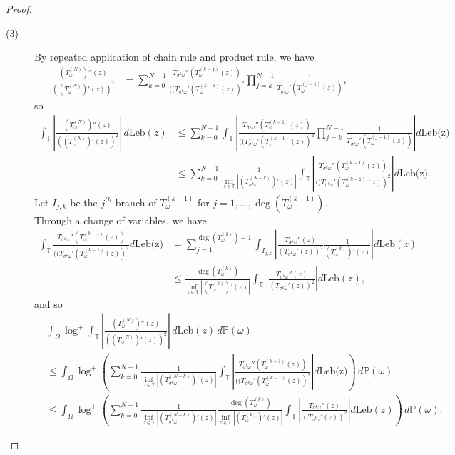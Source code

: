 \documentclass[12pt,reqno]{amsart}
\numberwithin{theorem}{section}
\begin{document}
\begin{proof}
\begin{description}
    \item[(3)] By repeated application of chain rule and product rule, we have \begin{align*}
        \frac{(T_{\omega}^{(N)})''(z)}{((T_{\omega}^{(N)})'(z))^2}&=\sum_{k=0}^{N-1}\frac{T_{\sigma^{k}\omega}''(T_{\omega}^{(k-1)}(z))}{((T_{\sigma^{k}\omega}'(T_{\omega}^{(k-1)}(z))^2}\prod_{j=k}^{N-1}\frac{1}{T_{\sigma^{j}\omega}'(T_{\omega}^{(j-1)}(z))},
    \end{align*} so \begin{align*}
        \int_{\mathbb{T}}\left|\frac{(T_{\omega}^{(N)})''(z)}{((T_{\omega}^{(N)})'(z))^2}\right|\,d\text{Leb}(z)&\le\sum_{k=0}^{N-1}\int_{\mathbb{T}}\left|\frac{T_{\sigma^{k}\omega}''(T_{\omega}^{(k-1)}(z))}{((T_{\sigma^{k}\omega}'(T_{\omega}^{(k-1)}(z))^2}\prod_{j=k}^{N-1}\frac{1}{T_{\sigma^{j}\omega}'(T_{\omega}^{(j-1)}(z))}\right|d\text{Leb(z)}\\&\le\sum_{k=0}^{N-1}\frac{1}{\inf_{z\in\mathbb{T}}|(T_{\sigma^{k}\omega}^{(N-k)})'(z)|}\int_{\mathbb{T}}\left|\frac{T_{\sigma^{k}\omega}''(T_{\omega}^{(k-1)}(z))}{((T_{\sigma^{k}\omega}'(T_{\omega}^{(k-1)}(z))^2}\right|d\text{Leb(z)}.
    \end{align*} Let $I_{j,k}$ be the $j^{th}$ branch of $T_{\omega}^{(k-1)}$ for $j=1,...,\deg(T_{\omega}^{(k-1)}).$ Through a change of variables, we have \begin{align*} \int_{\mathbb{T}}\frac{T_{\sigma^{k}\omega}''(T_{\omega}^{(k-1)}(z))}{((T_{\sigma^{k}\omega}'(T_{\omega}^{(k-1)}(z))^2}d\text{Leb(z)}&=\sum_{j=1}^{\deg(T_{\omega}^{(k)})-1}\int_{I_{j,k}}\left|\frac{T_{\sigma^{k}\omega}''(z)}{(T_{\sigma^{k}\omega}'(z))^2}\frac{1}{(T_{\omega}^{(k)})'(z)}\right|d\text{Leb}(z)\\&\le\frac{\deg(T_{\omega}^{(k)})}{\inf_{z\in\mathbb{T}}|(T_{\omega}^{(k)})'(z)|}\int_{\mathbb{T}}\left|\frac{T_{\sigma^{k}\omega}''(z)}{(T_{\sigma^{k}\omega}'(z))^2}\right|d\text{Leb}(z),
    \end{align*} and so \begin{align*}
        &\int_{\Omega}\log^{+}\int_{\mathbb{T}}\left|\frac{(T_{\omega}^{(N)})''(z)}{((T_{\omega}^{(N)})'(z))^2}\right|\,d\text{Leb}(z)\,d\mathbb{P}(\omega)\\&\le\int_{\Omega}\log^{+}\left(\sum_{k=0}^{N-1}\frac{1}{\inf_{z\in\mathbb{T}}|(T_{\sigma^{k}\omega}^{(N-k)})'(z)|}\int_{\mathbb{T}}\left|\frac{T_{\sigma^{k}\omega}''(T_{\omega}^{(k-1)}(z))}{((T_{\sigma^{k}\omega}'(T_{\omega}^{(k-1)}(z))^2}\right|d\text{Leb(z)}\right)\,d\mathbb{P}(\omega)\\&\le \int_{\Omega}\log^{+}\left(\sum_{k=0}^{N-1}\frac{1}{\inf_{z\in\mathbb{T}}|(T_{\sigma^{k}\omega}^{(N-k)})'(z)|}\frac{\deg(T_{\omega}^{(k)})}{\inf_{z\in\mathbb{T}}|(T_{\omega}^{(k)})'(z)|}\int_{\mathbb{T}}\left|\frac{T_{\sigma^{k}\omega}''(z)}{(T_{\sigma^{k}\omega}'(z))^2}\right|d\text{Leb}(z)\right)\,d\mathbb{P}(\omega).\end{align*} 
        

\end{description}
\end{proof}
\end{document}
